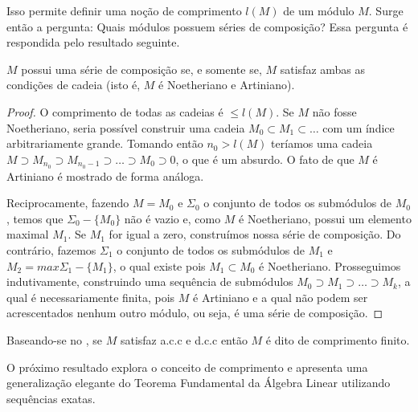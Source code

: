 Isso permite definir uma noção de comprimento $l(M)$ de um módulo $M$. Surge então a pergunta: Quais módulos possuem séries de composição? Essa pergunta é respondida pelo resultado seguinte.
\begin{theorem}
	\label{loc:6.8_:_série_de_composição_e_condições_de_cadeia.proposição}
	$M$ possui uma série de composição se, e somente se, $M$ satisfaz ambas as condições de cadeia (isto é, $M$ é Noetheriano e Artiniano).
	\begin{proof}

		O comprimento de todas as cadeias é $\leq l(M)$. Se $M$ não fosse Noetheriano, seria possível construir uma cadeia $M_0 \subset M_{1}\subset\dots$ com um índice arbitrariamente grande. Tomando então $n_{0}> l(M)$ teríamos uma cadeia $M \supset M_{n_{0}} \supset M_{n_{0}-1}\supset\dots \supset M_{0} \supset 0$, o que é um absurdo.
		O fato de que $M$ é Artiniano é mostrado de forma análoga.

		Reciprocamente, fazendo $M=M_{0}$ e $\Sigma_{0}$ o conjunto de todos os submódulos de $M_{0}$, temos que $\Sigma_{0}-\{ M_{0} \}$ não é vazio e, como $M$ é Noetheriano, possui um elemento maximal $M_{1}$. Se $M_{1}$ for igual a zero, construímos nossa série de composição. Do contrário, fazemos $\Sigma_{1}$ o conjunto de todos os submódulos de $M_{1}$ e $M_{2}=max\Sigma_{1}-\{ M_{1} \}$, o qual existe pois $M_{1} \subset M_{0}$ é Noetheriano.
		Prosseguimos indutivamente, construindo uma sequência de submódulos $M_{0}\supset M_{1}\supset\dots \supset M_{k}$, a qual é necessariamente finita, pois $M$ é Artiniano e a qual não podem ser acrescentados nenhum outro módulo, ou seja, é uma série de composição.
	\end{proof}
\end{theorem}
\begin{definition}
	\label{loc:6.8_:_série_de_composição_e_condições_de_cadeia.definição_comprimento_finito}
	Baseando-se no , se $M$ satisfaz a.c.c e d.c.c então $M$ é dito de comprimento finito.
\end{definition}
O próximo resultado explora o conceito de comprimento e apresenta uma generalização elegante do Teorema Fundamental da Álgebra Linear utilizando sequências exatas.
